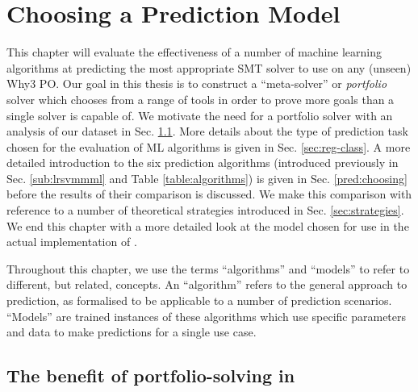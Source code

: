 \chapter{Choosing a Prediction Model}
\thispagestyle{nohead}
\label{Prediction}

This chapter will evaluate the effectiveness of a number of machine learning algorithms at predicting the most appropriate SMT solver to use on any (unseen) \textsf{Why3} PO.
Our goal in this thesis is to construct a ``meta-solver'' or \textit{portfolio} solver which chooses from a range of tools in order to prove more goals than a single solver is capable of.
We motivate the need for a portfolio solver with an analysis of our dataset 
in Sec. \ref{sec:portfolio-benefit}. 
More details about the type of prediction task chosen for the evaluation of ML algorithms is given in Sec. \ref{sec:reg-class}.
A more detailed introduction to the six prediction algorithms (introduced previously in Sec. \ref{sub:lrsvmmml} and Table \ref{table:algorithms}) is given in Sec. \ref{pred:choosing} before the results of their comparison is discussed. 
We make this comparison with reference to a number of theoretical strategies introduced in Sec. \ref{sec:strategies}.
We end this chapter with a more detailed look at the model chosen for use in the actual implementation of \where.

Throughout this chapter, we use the terms ``algorithms'' and ``models'' to refer to different, but related, concepts. An ``algorithm'' refers to the general approach to prediction, as formalised to be applicable to a number of prediction scenarios.
``Models'' are trained instances of these algorithms which use specific parameters and data to make predictions for a single use case.

\section{The benefit of portfolio-solving in \why}
\label{sec:portfolio-benefit}

